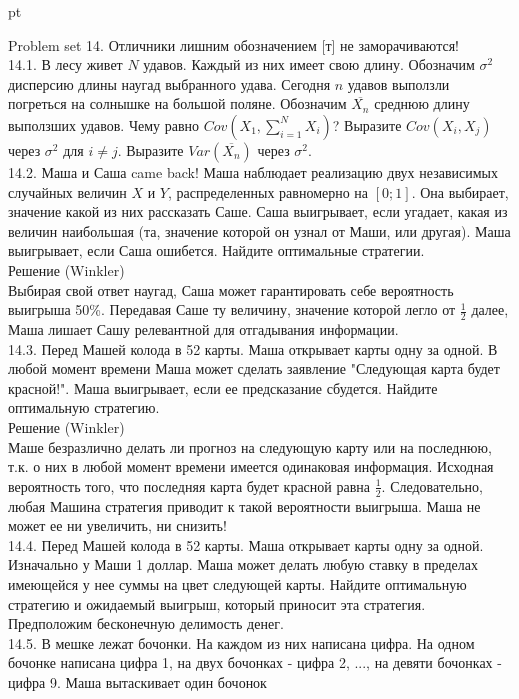 \documentclass[pdftex,12pt,a4paper]{article}
\begin{document}
 pt %

Problem set 14. Отличники лишним обозначением [т] не заморачиваются! \\
14.1. В лесу живет $N$ удавов. Каждый из них имеет свою длину.
Обозначим $\sigma^2$ дисперсию длины наугад выбранного удава.
Сегодня $n$ удавов выползли погреться на солнышке на большой
поляне. Обозначим $\overline{X_{n}}$ среднюю длину выползших
удавов. Чему равно $Cov(X_{1},\sum_{i=1}^{N} X_{i})$? Выразите
$Cov(X_{i},X_{j})$ через $\sigma^{2}$ для $i\neq j$. Выразите
$Var(\overline{X_{n}})$ через $\sigma^{2}$. \\
14.2. Маша и Саша came back! Маша наблюдает реализацию двух
независимых случайных величин $X$ и $Y$, распределенных равномерно
на $[0;1]$. Она выбирает, значение какой из них рассказать Саше.
Саша выигрывает, если угадает, какая из величин наибольшая (та,
значение которой он узнал от Маши, или другая). Маша выигрывает,
если Саша ошибется. Найдите оптимальные стратегии. \\
Решение (Winkler) \\
Выбирая свой ответ наугад, Саша может гарантировать себе
вероятность выигрыша 50\%. Передавая Саше ту величину, значение
которой легло от $\frac{1}{2}$ далее, Маша лишает Сашу релевантной
для отгадывания информации. \\
14.3. Перед Машей колода в 52 карты. Маша открывает карты одну за
одной. В любой момент времени Маша может сделать заявление
"Следующая карта будет красной!". Маша выигрывает, если ее
предсказание сбудется. Найдите оптимальную стратегию. \\
Решение (Winkler) \\
Маше безразлично делать ли прогноз на следующую карту или на
последнюю, т.к. о них в любой момент времени имеется одинаковая
информация. Исходная вероятность того, что последняя карта будет
красной равна $\frac{1}{2}$. Следовательно, любая Машина стратегия
приводит к такой вероятности выигрыша. Маша не может ее ни
увеличить, ни снизить! \\
14.4. Перед Машей колода в 52 карты. Маша открывает карты одну за
одной. Изначально у Маши 1 доллар. Маша может делать любую ставку
в пределах имеющейся у нее суммы на цвет следующей карты. Найдите
оптимальную стратегию и ожидаемый выигрыш, который приносит эта
стратегия.
Предположим бесконечную делимость денег. \\
14.5. В мешке лежат бочонки. На каждом из них написана цифра. На
одном бочонке написана цифра 1, на двух бочонках - цифра 2, ...,
на девяти бочонках - цифра 9. Маша вытаскивает один бочонок
\end{document}
